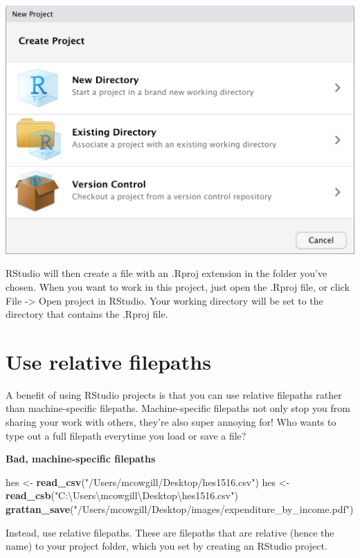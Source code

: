 \documentclass[]{book}
\newenvironment{Shaded}{\begin{snugshade}}{\end{snugshade}}
\newcommand{\KeywordTok}[1]{\textcolor[rgb]{0.13,0.29,0.53}{\textbf{#1}}}
\newcommand{\NormalTok}[1]{#1}
\newcommand{\StringTok}[1]{\textcolor[rgb]{0.31,0.60,0.02}{#1}}
\begin{document}
\begin{center}\includegraphics[width=0.66\linewidth]{atlas/rstudio_newproject} \end{center}

RStudio will then create a file with an .Rproj extension in the folder you've chosen. When you want to work in this project, just open the .Rproj file, or click File -\textgreater{} Open project in RStudio. Your working directory will be set to the directory that contains the .Rproj file.

\hypertarget{use-relative-filepaths}{%
\section{Use relative filepaths}\label{use-relative-filepaths}}

A benefit of using RStudio projects is that you can use relative filepaths rather than machine-specific filepaths.
Machine-specific filepaths not only stop you from sharing your work with others, they're also super annoying for! Who wants to type out a full filepath everytime you load or save a file?

\textbf{Bad, machine-specific filepaths}

\begin{Shaded}
\begin{Highlighting}[]
\NormalTok{hes <-}\StringTok{ }\KeywordTok{read_csv}\NormalTok{(}\StringTok{"/Users/mcowgill/Desktop/hes1516.csv"}\NormalTok{)}
\NormalTok{hes <-}\StringTok{ }\KeywordTok{read_csb}\NormalTok{(}\StringTok{"C:\textbackslash{}Users\textbackslash{}mcowgill\textbackslash{}Desktop\textbackslash{}hes1516.csv"}\NormalTok{)}
\KeywordTok{grattan_save}\NormalTok{(}\StringTok{"/Users/mcowgill/Desktop/images/expenditure_by_income.pdf"}\NormalTok{)}
\end{Highlighting}
\end{Shaded}

Instead, use relative filepaths. These are filepaths that are relative (hence the name) to your project folder, which you set by creating an RStudio project.
\end{document}
